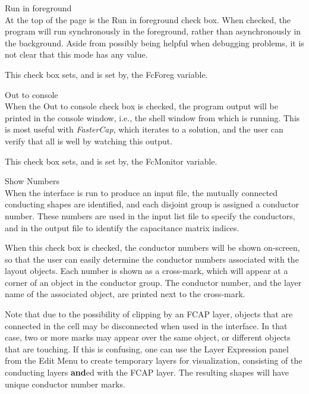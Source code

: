 \begin{description}
\item{\cb Run in foreground}\\
At the top of the page is the {\cb Run in foreground} check box.  When
checked, the program will run synchronously in the foreground, rather
than asynchronously in the background.  Aside from possibly being
helpful when debugging problems, it is not clear that this mode has
any value.

This check box sets, and is set by, the {\et FcForeg} variable.

\item{\cb Out to console}\\
When the {\cb Out to console} check box is checked, the program output
will be printed in the console window, i.e., the shell window from
which {\Xic} is running.  This is most useful with {\it FasterCap},
which iterates to a solution, and the user can verify that all is well
by watching this output.

This check box sets, and is set by, the {\et FcMonitor} variable.

\item{\cb Show Numbers}\\
When the interface is run to produce an input file, the mutually
connected conducting shapes are identified, and each disjoint group is
assigned a conductor number.  These numbers are used in the input list
file to specify the conductors, and in the output file to identify the
capacitance matrix indices.

When this check box is checked, the conductor numbers will be shown
on-screen, so that the user can easily determine the conductor numbers
associated with the layout objects.  Each number is shown as a
cross-mark, which will appear at a corner of an object in the
conductor group.  The conductor number, and the layer name of the
associated object, are printed next to the cross-mark.

Note that due to the possibility of clipping by an {\vt FCAP} layer,
objects that are connected in the cell may be disconnected when used
in the interface.  In that case, two or more marks may appear over the
same object, or different objects that are touching.  If this is
confusing, one can use the {\cb Layer Expression} panel from the {\cb
Edit Menu} to create temporary layers for visualization, consisting of
the conducting layers {\bf and}ed with the {\vt FCAP} layer.  The
resulting shapes will have unique conductor number marks.


\end{description}
